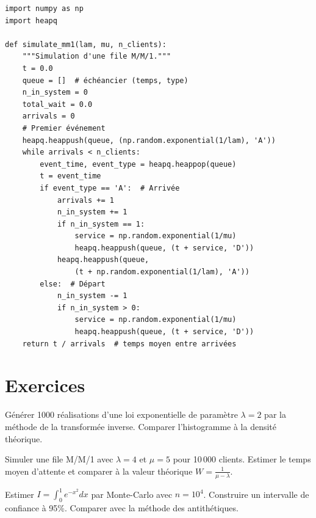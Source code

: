 \begin{codeblock}[title=\textbf{Simulation M/M/1 par \'ev\'enements discrets}]
\begin{verbatim}
import numpy as np
import heapq

def simulate_mm1(lam, mu, n_clients):
    """Simulation d'une file M/M/1."""
    t = 0.0
    queue = []  # échéancier (temps, type)
    n_in_system = 0
    total_wait = 0.0
    arrivals = 0
    # Premier événement
    heapq.heappush(queue, (np.random.exponential(1/lam), 'A'))
    while arrivals < n_clients:
        event_time, event_type = heapq.heappop(queue)
        t = event_time
        if event_type == 'A':  # Arrivée
            arrivals += 1
            n_in_system += 1
            if n_in_system == 1:
                service = np.random.exponential(1/mu)
                heapq.heappush(queue, (t + service, 'D'))
            heapq.heappush(queue,
                (t + np.random.exponential(1/lam), 'A'))
        else:  # Départ
            n_in_system -= 1
            if n_in_system > 0:
                service = np.random.exponential(1/mu)
                heapq.heappush(queue, (t + service, 'D'))
    return t / arrivals  # temps moyen entre arrivées
\end{verbatim}
\end{codeblock}

\section{Exercices}

\begin{exercice}
G\'en\'erer 1000 r\'ealisations d'une loi exponentielle de param\`etre
$\lambda = 2$ par la m\'ethode de la transform\'ee inverse. Comparer
l'histogramme \`a la densit\'e th\'eorique.
\end{exercice}

\begin{exercice}
Simuler une file M/M/1 avec $\lambda = 4$ et $\mu = 5$ pour 10\,000 clients.
Estimer le temps moyen d'attente et comparer \`a la valeur th\'eorique
$W = \frac{1}{\mu - \lambda}$.
\end{exercice}

\begin{exercice}
Estimer $I = \int_0^1 e^{-x^2} dx$ par Monte-Carlo avec $n = 10^4$.
Construire un intervalle de confiance \`a 95\%. Comparer avec la m\'ethode
des antith\'etiques.
\end{exercice}

